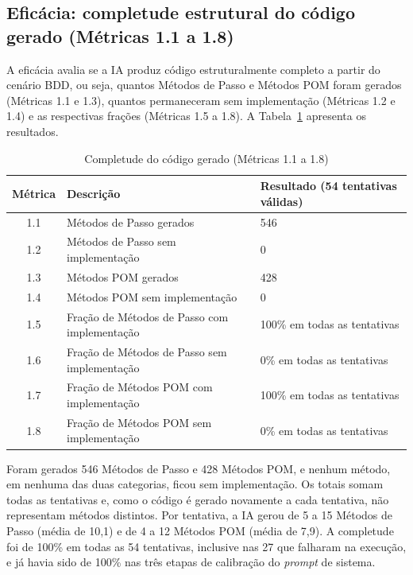 \subsection{Eficácia: completude estrutural do código gerado (Métricas 1.1 a 1.8)}
\label{subsec:eficacia}

A eficácia avalia se a IA produz código estruturalmente completo a partir do cenário BDD, ou seja, quantos Métodos de Passo e Métodos POM foram gerados (Métricas 1.1 e 1.3), quantos permaneceram sem implementação (Métricas 1.2 e 1.4) e as respectivas frações (Métricas 1.5 a 1.8). A Tabela~\ref{tab:completude} apresenta os resultados.

\begin{table}[htb]
\centering
\caption{Completude do código gerado (Métricas 1.1 a 1.8)}
\label{tab:completude}
\begin{tabular}{cp{7.2cm}p{4.6cm}}
\hline
\textbf{Métrica} & \textbf{Descrição} & \textbf{Resultado (54 tentativas válidas)} \\
\hline
1.1 & Métodos de Passo gerados & 546 \\
1.2 & Métodos de Passo sem implementação & 0 \\
1.3 & Métodos POM gerados & 428 \\
1.4 & Métodos POM sem implementação & 0 \\
1.5 & Fração de Métodos de Passo com implementação & 100\% em todas as tentativas \\
1.6 & Fração de Métodos de Passo sem implementação & 0\% em todas as tentativas \\
1.7 & Fração de Métodos POM com implementação & 100\% em todas as tentativas \\
1.8 & Fração de Métodos POM sem implementação & 0\% em todas as tentativas \\
\hline
\end{tabular}
\end{table}

Foram gerados 546 Métodos de Passo e 428 Métodos POM, e nenhum método, em nenhuma das duas categorias, ficou sem implementação. Os totais somam todas as tentativas e, como o código é gerado novamente a cada tentativa, não representam métodos distintos. Por tentativa, a IA gerou de 5 a 15 Métodos de Passo (média de 10,1) e de 4 a 12 Métodos POM (média de 7,9). A completude foi de 100\% em todas as 54 tentativas, inclusive nas 27 que falharam na execução, e já havia sido de 100\% nas três etapas de calibração do \textit{prompt} de sistema.

